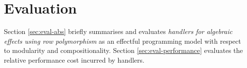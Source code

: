 \chapter{Evaluation}\label{ch:evaluation}
Section \ref{sec:eval-abs} briefly summarises and evaluates \emph{handlers for algebraic effects using row polymorphism} as an effectful programming model with respect to modularity and compositionality. Section \ref{sec:eval-performance} evaluates the relative performance cost incurred by handlers.